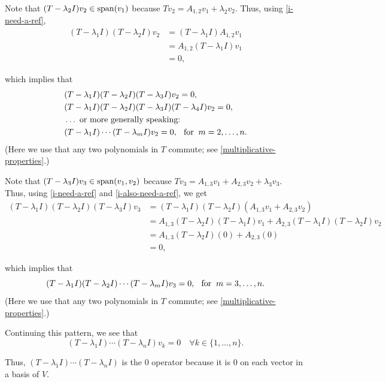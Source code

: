 \begin{prf}
  Note that $(T-\lambda_2 I) v_2 \in \operatorname{span} (v_1)$ because $T v_2 = A_{1,2} v_1 + \lambda_2 v_2$. Thus, using \eqref{i-need-a-ref},
  \begin{equation}
    \begin{aligned}
      \label{i-also-need-a-ref}
      (T- \lambda_1 I) (T- \lambda_2 I) v_2
      &= (T- \lambda_1 I) A_{1,2}v_1  \\
      &= A_{1,2}(T- \lambda_1 I) v_1  \\
      &=0,
    \end{aligned}
  \end{equation}

  which implies that
  \begin{equation}
    \begin{aligned}
        &(T-\lambda_1 I) (T-\lambda_2 I)(T-\lambda_3 I) v_2 = 0, \\
        &(T-\lambda_1 I) (T-\lambda_2 I)(T-\lambda_3 I)(T-\lambda_4 I) v_2 = 0, \\
        &\ldots \text{ or more generally speaking:} \\
        &(T-\lambda_1 I) \cdots (T-\lambda_m I) v_2 = 0, \;\;\, \text{for}\;\; m = 2, \ldots, n.
    \end{aligned}
  \end{equation}
  (Here we use that any two polynomials in $T$ commute; see \ref{multiplicative-properties}.)
  \bigbreak

  Note that $(T-\lambda_3 I) v_3 \in \operatorname{span} (v_1, v_2)$ because $T v_3 = A_{1,3} v_1 +   A_{2,3} v_2 + \lambda_3 v_3$. \\
  Thus, using \eqref{i-need-a-ref} and \eqref{i-also-need-a-ref}, we get
  \begin{equation}
    \begin{aligned}
      (T- \lambda_1 I) (T- \lambda_2 I) (T- \lambda_3 I)v_3
      &=(T- \lambda_1 I) (T- \lambda_2 I)(A_{1,3} v_1 +   A_{2,3} v_2)  \\
      &= A_{1,3} (T- \lambda_2 I) (T- \lambda_1 I) v_1 + A_{2,3} (T- \lambda_1 I) (T- \lambda_2 I) v_2 \\
      &= A_{1,3} (T- \lambda_2 I)(0) + A_{2,3}(0) \\
      &= 0,
    \end{aligned}
  \end{equation}

  which implies that
  \begin{equation}
    (T-\lambda_1 I) (T-\lambda_2 I) \cdots (T-\lambda_m I) v_3= 0, \;\;\, \text{for}\;\; m = 3, \ldots, n.
  \end{equation}
  (Here we use that any two polynomials in $T$ commute; see \ref{multiplicative-properties}.)
  \bigbreak

  Continuing this pattern, we see that
  \begin{equation}
    (T-\lambda_1 I) \cdots (T- \lambda_n I) v_k = 0 \quad \forall k \in \{ 1, \ldots, n \}.
  \end{equation}

  Thus, $(T-\lambda_1 I) \cdots (T- \lambda_n I)$ is the $0$ operator because it is $0$ on each vector in a basis of $V$.
\end{prf}


